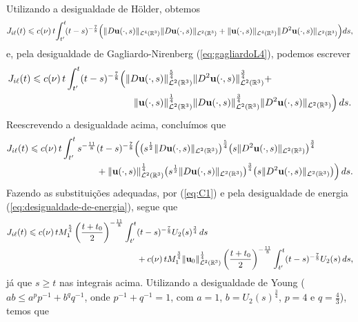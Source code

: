 \begin{prf}
\[\begin{aligned}
        \end{aligned}
    \]
    Utilizando a desigualdade de Hölder, obtemos
    \[
        J_{i\ell}(t) \leqslant c(\nu) \, t \! \int_{t'}^t \! (t - s)^{-\frac{7}{8}} \Big( \Vert D\mathbf{u}(\cdot,s) \Vert_{\mathcal{L}^4(\mathbb{R}^3)} \Vert D\mathbf{u}(\cdot,s) \Vert_{\mathcal{L}^2(\mathbb{R}^3)}+ \Vert \mathbf{u}(\cdot,s) \Vert_{\mathcal{L}^4(\mathbb{R}^3)} \Vert D^2\mathbf{u}(\cdot,s) \Vert_{\mathcal{L}^2(\mathbb{R}^3)} \Big) ds,
    \]
    e, pela desigualdade de Gagliardo-Nirenberg (\ref{eq:gagliardoL4}), podemos escrever
    \[
        \begin{aligned}
            J_{i\ell}(t) \leqslant c(\nu) \, t \int_{t'}^t  (t - s)^{-\frac{7}{8}} \Big( \Vert D\mathbf{u}(\cdot,s) &\Vert_{\mathcal{L}^2(\mathbb{R}^3)}^{\frac{5}{4}} \Vert D^2\mathbf{u}(\cdot,s) \Vert_{\mathcal{L}^2(\mathbb{R}^3)}^{\frac{3}{4}} +\\ \Vert \mathbf{u}(\cdot,s) &\Vert_{\mathcal{L}^2(\mathbb{R}^3)}^{\frac{1}{4}} \Vert D\mathbf{u}(\cdot,s) \Vert_{\mathcal{L}^2(\mathbb{R}^3)}^{\frac{3}{4}} \Vert D^2\mathbf{u}(\cdot,s) \Vert_{\mathcal{L}^2(\mathbb{R}^3)} \Big) \, ds.
        \end{aligned}
    \]
    Reescrevendo a desigualdade acima, concluímos que
    \[
        \begin{aligned}
            J_{i\ell}(t) \leqslant c(\nu) \, t \int_{t'}^t s^{-\frac{11}{8}} &(t - s)^{-\frac{7}{8}} \Big( \big(s^{\frac{1}{2}}\Vert D\mathbf{u}(\cdot,s) \Vert_{\mathcal{L}^2(\mathbb{R}^3)} \big)^{\frac{5}{4}} \big( s\Vert D^2\mathbf{u}(\cdot,s) \Vert_{\mathcal{L}^2(\mathbb{R}^3)}\big)^{\frac{3}{4}}\\ &+ \Vert \mathbf{u}(\cdot,s) \Vert_{\mathcal{L}^2(\mathbb{R}^3)}^{\frac{1}{4}} \big( s^{\frac{1}{2}}\Vert D\mathbf{u}(\cdot,s) \Vert_{\mathcal{L}^2(\mathbb{R}^3)}\big)^{\frac{3}{4}} \big(s\Vert D^2\mathbf{u}(\cdot,s) \Vert_{\mathcal{L}^2(\mathbb{R}^3)}\big) \Big) \, ds.
        \end{aligned}
    \]
    Fazendo as substituições adequadas, por (\ref{eq:C1}) e pela desigualdade de energia (\ref{eq:desigualdade-de-energia}), segue que
    \[
        \begin{aligned}
            J_{i\ell}(t) \leqslant c(\nu) \,t M_1^{\frac{5}{4}} \left( \frac{t + t_0}{2} \right)^{-\frac{11}{8}} \int_{t'}^t &(t - s)^{-\frac{7}{8}} U_2(s)^{\frac{3}{4}} \,ds\\ 
            &+ c(\nu) \, t M_1^{\frac{3}{4}} \Vert \mathbf{u}_0 \Vert^{\frac{1}{4}}_{\mathcal{L}^2(\mathbb{R}^3)} \left( \frac{t + t_0}{2} \right)^{-\frac{11}{8}} \int_{t'}^{t} (t - s)^{-\frac{7}{8}} U_2(s) \,ds,
        \end{aligned}
    \]
    já que $s \geqslant t$ nas integrais acima. 
    Utilizando a desigualdade de Young ($ab \leqslant a^pp^{-1} + b^q q^{-1}$, onde $p^{-1} + q^{-1} = 1$, com $a = 1$, $b = U_2(s)^{\frac{3}{4}}$, $p = 4$ e $q = \frac{4}{3}$), temos que

\end{prf}
